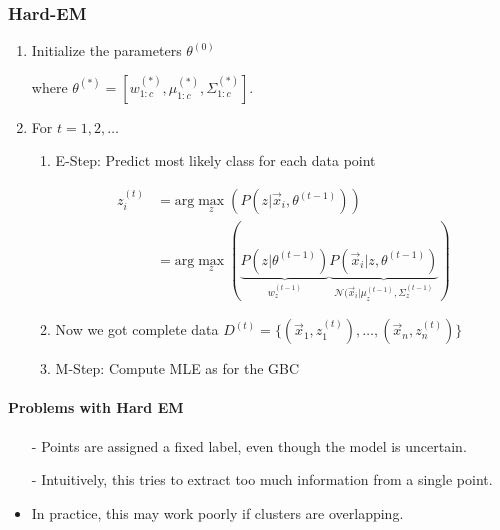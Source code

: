 \documentclass[10pt,a4paper]{scrartcl}
\newcommand{\Argmax}[2]{\text{arg}\underset{#1}{\max}\left(#2\right)}
\begin{document}
\begin{multicols*}{2}
\begin{itemize}
\end{itemize}

\subsubsection{Hard-EM}

\begin{enumerate}
\item Initialize the parameters $\theta^{(0)}$

where $\theta^{(\ast)}=\left[w_{1:c}^{(\ast)},\mu_{1:c}^{(\ast)},\Sigma_{1:c}^{(\ast)}\right]$.
\item For $t=1,2,\ldots$
\begin{enumerate}
\item E-Step: Predict most likely class for each data point

\begin{align*}
z_i^{(t)}&=\Argmax{z}{P(z|\vec{x}_i,\theta^{(t-1)})}\\
&=\Argmax{z}{\underbrace{P(z|\theta^{(t-1)})}_{w_z^{(t-1)}}\underbrace{P(\vec{x}_i|z,\theta^{(t-1)})}_{\mathcal{N}(\vec{x}_i|\mu_z^{(t-1)},\Sigma_z^{(t-1)}}}
\end{align*}
\item Now we got complete data $D^{(t)}=\{(\vec{x}_1,z_1^{(t)}),\ldots,(\vec{x}_n,z_n^{(t)})\}$
\item M-Step: Compute MLE as for the GBC

\mportant{$\theta^{(t)}=\Argmax{\theta}{P(D^{(t)}|\theta)}$}
\end{enumerate}
\end{enumerate}

\paragraph{Problems with Hard EM}

\begin{itemize}
\item[-] Points are assigned a fixed label, even though the model is uncertain.
\item[-] Intuitively, this tries to extract too much information from a single point.
\item In practice, this may work poorly if clusters are overlapping.
\end{itemize}


\end{multicols*}
\end{document}
